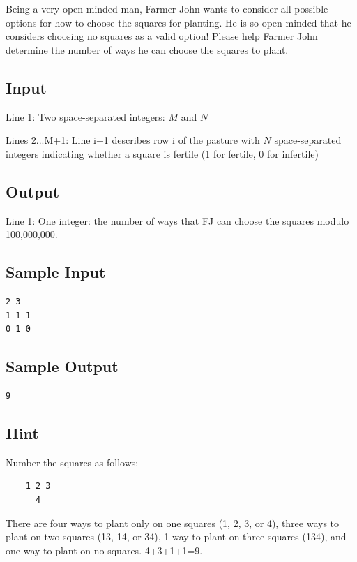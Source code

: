 \documentclass{report}
\begin{document}
Being a very open-minded man, Farmer John wants to consider all possible options for how to choose the squares for planting. He is so open-minded that he considers choosing no squares as a valid option! Please help Farmer John determine the number of ways he can choose the squares to plant.

\subsection{Input}
Line 1: Two space-separated integers: $M$ and $N$ \par
Lines 2...M+1: Line i+1 describes row i of the pasture with $N$ space-separated integers indicating whether a square is fertile (1 for fertile, 0 for infertile)\par

\subsection{Output}
Line 1: One integer: the number of ways that FJ can choose the squares modulo 100,000,000.\par

\subsection{Sample Input}
\begin{lstlisting}
2 3
1 1 1
0 1 0
\end{lstlisting}

\subsection{Sample Output}
\begin{lstlisting}
9
\end{lstlisting}

\subsection{Hint}
Number the squares as follows:\par
\begin{lstlisting}
    1 2 3
      4
\end{lstlisting}

There are four ways to plant only on one squares (1, 2, 3, or 4), three ways to plant on two squares (13, 14, or 34), 1 way to plant on three squares (134), and one way to plant on no squares. 4+3+1+1=9.
\end{document}
